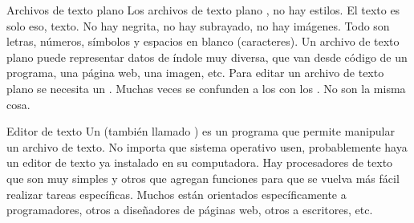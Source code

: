 
\begin{frame}{Archivos de texto plano}
  Los archivos de texto plano , no hay estilos.
  El texto es solo eso, texto. No hay negrita, no hay subrayado, no hay imágenes.
  Todo son letras, números, símbolos y espacios en blanco (caracteres).
  \jump
  Un archivo de texto plano puede representar datos de índole muy diversa, que van
  desde código de un programa, una página web, una imagen, etc.
  \jump
  Para editar un archivo de texto plano se necesita un .
  \jump
  Muchas veces se confunden a los  con los . No son la misma cosa.
\end{frame}


\begin{frame}{Editor de texto}
  Un  (también llamado ) es
  un programa que permite manipular un archivo de texto. No importa que sistema
  operativo usen, probablemente haya un editor de texto ya instalado en su
  computadora.
  \jump
  Hay procesadores de texto que son muy simples y otros que agregan funciones para
  que se vuelva más fácil realizar tareas específicas. Muchos están orientados
  específicamente a programadores, otros a diseñadores de páginas web, otros a
  escritores, etc.
\end{frame}


